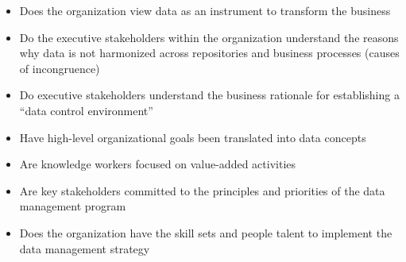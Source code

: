 \begin{description}[nosep,font=\bfseries]
  \begin{itemize}
    \item Does the organization view data as an instrument to transform the business
    \item Do the executive stakeholders within the organization understand the reasons why data is not harmonized across repositories and business processes (causes of incongruence)
    \item Do executive stakeholders understand the business rationale for establishing a “data control environment”
    \item Have high-level organizational goals been translated into data concepts
    \item Are knowledge workers focused on value-added activities
    \item Are key stakeholders committed to the principles and priorities of the data management program
    \item Does the organization have the skill sets and people talent to implement the data management strategy
  \end{itemize}

\end{description}










